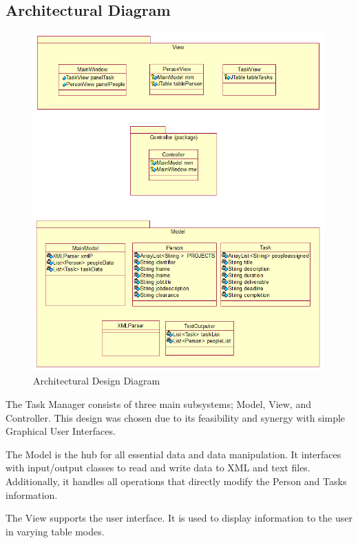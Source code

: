 \documentclass[12pt]{article}
\newcommand{\systemName}{Task Manager }
\begin{document}
\subsection{Architectural Diagram}

\begin{figure}[htbp]
\begin{center} \includegraphics[scale=.5]{Diagrams/archDiagram.png} \end{center}
\caption{Architectural Design Diagram}
\label{fig:arch-diagram1}
\end{figure}

The \systemName consists of three main subsystems; Model, View, and Controller. This design was chosen due to its feasibility and synergy with simple Graphical User Interfaces. 

The Model is the hub for all essential data and data manipulation. It interfaces with input/output classes to read and write data to XML and text files. Additionally, it handles all operations that directly modify the Person and Tasks information.

The View supports the user interface. It is used to display information to the user in varying table modes.
\end{document}
